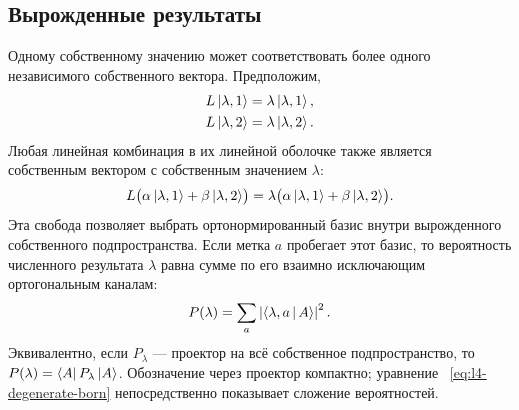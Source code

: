 \begin{classroomqa}
\end{classroomqa}

\begin{classroomqa}
\end{classroomqa}

\subsection{Вырожденные результаты}

Одному собственному значению может соответствовать более одного независимого собственного вектора. Предположим,
\begin{align}
L\left\lvert\lambda,1\right\rangle&=\lambda\left\lvert\lambda,1\right\rangle,\\
L\left\lvert\lambda,2\right\rangle&=\lambda\left\lvert\lambda,2\right\rangle.
\end{align}
Любая линейная комбинация в их линейной оболочке также является собственным вектором с собственным значением \(\lambda\):
\begin{equation}
L\bigl(\alpha\left\lvert\lambda,1\right\rangle+\beta\left\lvert\lambda,2\right\rangle\bigr)
=
\lambda\bigl(\alpha\left\lvert\lambda,1\right\rangle+\beta\left\lvert\lambda,2\right\rangle\bigr).
\end{equation}
Эта свобода позволяет выбрать ортонормированный базис внутри вырожденного собственного подпространства. Если метка \(a\) пробегает этот базис, то вероятность численного результата \(\lambda\) равна сумме по его взаимно исключающим ортогональным каналам:
\begin{equation}
P(\lambda)=\sum_a\left|\left\langle\lambda,a\,\middle|\,A\right\rangle\right|^2.
\label{eq:l4-degenerate-born}
\end{equation}
Эквивалентно, если \(P_\lambda\) — проектор на всё собственное подпространство, то \(P(\lambda)=\left\langle A\right\rvert P_\lambda\left\lvert A\right\rangle\). Обозначение через проектор компактно; уравнение ~\eqref{eq:l4-degenerate-born} непосредственно показывает сложение вероятностей.

